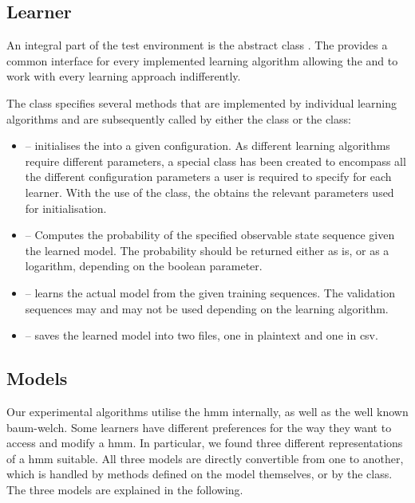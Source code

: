 \subsection{Learner}
An integral part of the test environment is the abstract class . The  provides a common interface for every implemented learning algorithm allowing the  and  to work with every learning approach indifferently.

The  class specifies several methods that are implemented by individual learning algorithms and are subsequently called by either the  class or the  class:

\begin{itemize}
	\item[]  -- initialises the  into a given configuration. As different learning algorithms require different parameters, a special class  has been created to encompass all the different configuration parameters a user is required to specify for each learner. With the use of the  class, the  obtains the relevant parameters used for initialisation.
	\item[]  -- Computes the probability of the specified observable state sequence given the learned model. The probability should be returned either as is, or as a logarithm, depending on the boolean  parameter.
	\item[]  -- learns the actual model from the given training sequences. The validation sequences may and may not be used depending on the learning algorithm.
	\item[]  -- saves the learned model into two files, one in plaintext and one in \gls{csv}.
\end{itemize}

\subsection{Models}

Our experimental algorithms utilise the \acrlong{hmm} internally, as well as the well known \gls{baum-welch}.
Some learners have different preferences for the way they want to access and modify a \gls{hmm}.
In particular, we found three different representations of a \gls{hmm} suitable. All three models are directly convertible from one to another, which is handled by methods defined on the model themselves, or by the class. The three models are explained in the following.

